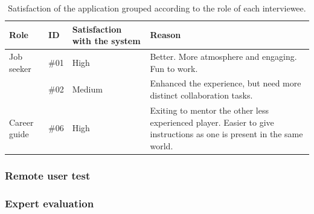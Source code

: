 \begin{table}[]
      \centering
        \begin{tabular}{llp{2.5cm}p{5cm}}
        \toprule
        Role & ID & Satisfaction with the system & Reason\\
        \midrule\vspace{0.2cm}
         Job seeker  & \#01 & High & Better. More atmosphere and engaging. Fun to work.\\
         & \#02  & Medium & Enhanced the experience, but need more distinct collaboration tasks.
         \\\midrule
        Career guide & \#06  & High &  Exiting to mentor the other less experienced player. Easier to give instructions as one is present in the same world. \\
        \bottomrule
        \end{tabular}
        \caption{Satisfaction of the application grouped according to the role of each interviewee.}
        \label{table:satificationInterview1}
\end{table}



\subsubsection{Remote user test}


\subsubsection{Expert evaluation}


\cleardoublepage